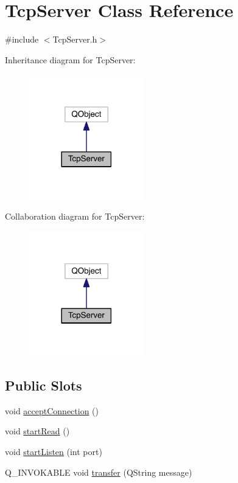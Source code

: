 \hypertarget{class_tcp_server}{\section{Tcp\+Server Class Reference}
\label{class_tcp_server}
}


{\ttfamily \#include $<$Tcp\+Server.\+h$>$}



Inheritance diagram for Tcp\+Server\+:\nopagebreak
\begin{figure}[H]
\begin{center}
\leavevmode
\includegraphics[width=141pt]{class_tcp_server__inherit__graph}
\end{center}
\end{figure}


Collaboration diagram for Tcp\+Server\+:\nopagebreak
\begin{figure}[H]
\begin{center}
\leavevmode
\includegraphics[width=141pt]{class_tcp_server__coll__graph}
\end{center}
\end{figure}
\subsection*{Public Slots}
\begin{DoxyCompactItemize}
\item 
void \hyperlink{class_tcp_server_a28472f8ff11060cf40b49ad95f0af775}{accept\+Connection} ()
\item 
void \hyperlink{class_tcp_server_aa265098a4a7e9bdcf624068f6640e0a5}{start\+Read} ()
\item 
void \hyperlink{class_tcp_server_acd34450fe8cd7174163d7b670a71f2ef}{start\+Listen} (int port)
\item 
Q\+\_\+\+I\+N\+V\+O\+K\+A\+B\+L\+E void \hyperlink{class_tcp_server_a3980ff848a8434857de6afac4971ada7}{transfer} (Q\+String message)
\end{DoxyCompactItemize}
